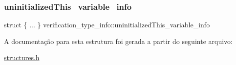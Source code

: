 \subsubsection{\texorpdfstring{uninitialized\+This\+\_\+variable\+\_\+info}{uninitializedThis\_variable\_info}}
{\footnotesize\ttfamily struct \{ ... \}   verification\+\_\+type\+\_\+info\+::uninitialized\+This\+\_\+variable\+\_\+info}



A documentação para esta estrutura foi gerada a partir do seguinte arquivo\+:\begin{DoxyCompactItemize}
\item 
\hyperlink{structures_8h}{structures.\+h}\end{DoxyCompactItemize}
